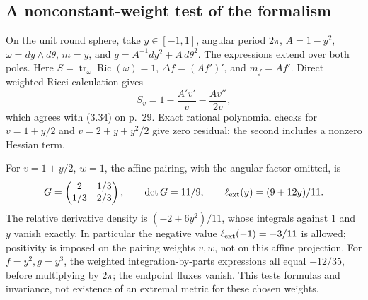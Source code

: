 \documentclass[10pt]{article}
\begin{document}
\subsection*{A nonconstant-weight test of the formalism}
On the unit round sphere, take \(y\in[-1,1]\), angular period \(2\pi\), \(A=1-y^2\), \(\omega=dy\wedge d\theta\), \(m=y\), and \(g=A^{-1}dy^2+A\,d\theta^2\). The expressions extend over both poles. Here \(S=\operatorname{tr}_\omega\operatorname{Ric}(\omega)=1\), \(\Delta f=(Af')'\), and \(m_f=Af'\). Direct weighted Ricci calculation gives \[S_v=1-\frac{A'v'}{v}-\frac{Av''}{2v},\] which agrees with (3.34) on p. 29. Exact rational polynomial checks for \(v=1+y/2\) and \(v=2+y+y^2/2\) give zero residual; the second includes a nonzero Hessian term.\par
For \(v=1+y/2\), \(w=1\), the affine pairing, with the angular factor omitted, is \[G=\begin{pmatrix}2&1/3\\1/3&2/3\end{pmatrix},\qquad
 \det G=11/9,\qquad \ell_{\rm ext}(y)=(9+12y)/11.\] The relative derivative density is \((-2+6y^2)/11\), whose integrals against \(1\) and \(y\) vanish exactly. In particular the negative value \(\ell_{\rm ext}(-1)=-3/11\) is allowed; positivity is imposed on the pairing weights \(v,w\), not on this affine projection. For \(f=y^2,g=y^3\), the weighted integration-by-parts expressions all equal \(-12/35\), before multiplying by \(2\pi\); the endpoint fluxes vanish. This tests formulas and invariance, not existence of an extremal metric for these chosen weights.\par
\end{document}
